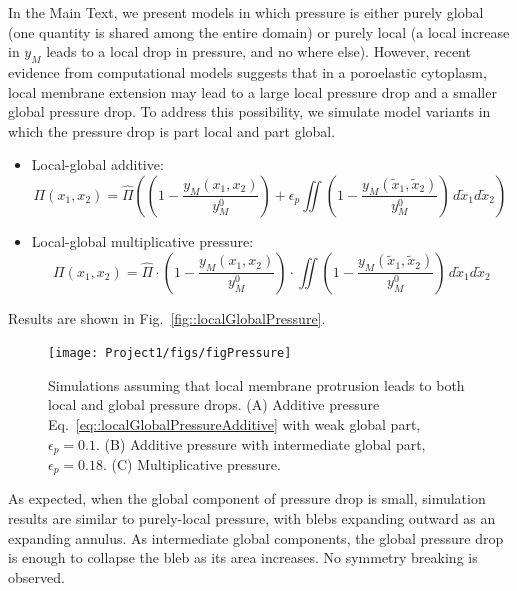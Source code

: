 In the Main Text, we present models in which pressure is either purely global (one quantity is shared among the entire domain) or purely local (a local increase in $y_M$ leads to a local drop in pressure, and no where else). However, recent evidence from computational models \cite{Strychalski:HizQv1Ti} suggests that in a poroelastic cytoplasm, local membrane extension may lead to a large local pressure drop and a smaller global pressure drop. To address this possibility, we simulate model variants in which the pressure drop is part local and part global.
\begin{itemize}
\item Local-global additive:
\begin{equation}
\Pi(x_1,x_2) = \hat{\Pi}\left(\left(1 - \frac{y_M(x_1,x_2)}{y_M^0}\right) + \epsilon_p \iint  \left(1 - \frac{y_M(\tilde{x}_1,\tilde{x}_2)}{y_M^0}\right)\, d\tilde{x}_1 d\tilde{x}_2\right)\ \label{eq::localGlobalPressureAdditive}
\end{equation}
\item Local-global multiplicative pressure:
\begin{equation}
\Pi(x_1,x_2) = \hat{\Pi}\cdot\left(1 - \frac{y_M(x_1,x_2)}{y_M^0}\right)\cdot \iint  \left(1 - \frac{y_M(\tilde{x}_1,\tilde{x}_2)}{y_M^0}\right)\, d\tilde{x}_1 d\tilde{x}_2 \label{eq::localGlobalPressureMultiplicative}
\end{equation}
\end{itemize}
Results are shown in Fig.~\ref{fig::localGlobalPressure}. 
\begin{figure}[h!]
   \begin{center}
   \captionsetup{width=17cm}
     \texttt{[image: Project1/figs/figPressure]}
      \caption{Simulations assuming that local membrane protrusion leads to both local and global pressure drops. (A) Additive pressure Eq.~\ref{eq::localGlobalPressureAdditive} with weak global part, $\epsilon_p=0.1$. (B) Additive pressure with intermediate global part, $\epsilon_p=0.18$. (C) Multiplicative pressure. }
      \label{fig::Project1/figs/localGlobalPressure}
   \end{center}
\end{figure}
As expected, when the global component of pressure drop is small, simulation results are similar to purely-local pressure, with blebs expanding outward as an expanding annulus. As intermediate global components, the global pressure drop is enough to collapse the bleb as its area increases. No symmetry breaking is observed. 

